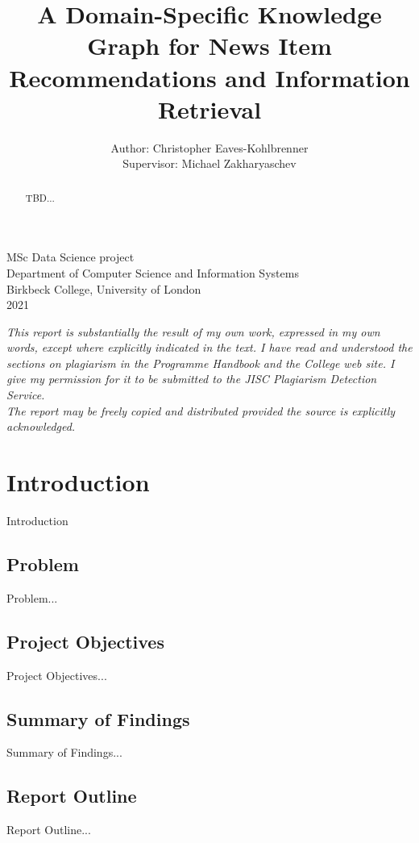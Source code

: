 \documentclass[11pt]{article}
\title{A Domain-Specific Knowledge Graph for News Item Recommendations and Information Retrieval}
\author{Author: Christopher Eaves-Kohlbrenner \\ Supervisor: Michael Zakharyaschev}
\begin{document}
\maketitle

\begin{center}
\hfill \break
\hfill \break
\hfill \break
MSc Data Science project\\
Department of Computer Science and Information Systems\\
Birkbeck College, University of London\\
2021\\
\hfill \break
\hfill \break
\hfill \break

\textit{This report is substantially the result of my own work, expressed in my own words, except where explicitly indicated in the text. I have read and understood the sections on plagiarism in the Programme Handbook and the College web site. I give my permission for it to be submitted to the JISC Plagiarism Detection Service. \\
\hfill \break
The report may be freely copied and distributed provided the source is explicitly acknowledged.}
\end{center}


\newpage
\begin{abstract}
TBD...
\end{abstract}

\newpage
\tableofcontents

\newpage
\section{Introduction}
Introduction
\subsection{Problem}
Problem...
\subsection{Project Objectives}
Project Objectives...
\subsection{Summary of Findings}
Summary of Findings...
\subsection{Report Outline}
Report Outline...
\end{document}
